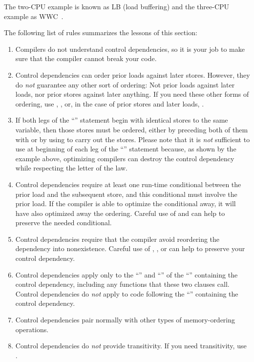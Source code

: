 The two-CPU example is known as LB (load buffering) and the three-CPU
example as WWC~\cite{Maranget2012TutorialARMPower}.

The following list of rules summarizes the lessons of this section:

\begin{enumerate}
\item	Compilers do not understand control dependencies, so it is
	your job to make sure that the compiler cannot break your code.

\item	Control dependencies can order prior loads against later stores.
	However, they do \emph{not} guarantee any other sort of ordering:
	Not prior loads against later loads, nor prior stores against
	later anything.
	If you need these other forms of ordering, use ,
	, or, in the case of prior stores and later loads,
	.

\item	If both legs of the ``'' statement begin with identical stores
	to the same variable, then those stores must be ordered,
	either by preceding both of them with  or by using
	 to carry out the stores.
	Please note that it is \emph{not} sufficient to use 
	at beginning of each leg of the ``'' statement because, as shown
	by the example above, optimizing compilers can destroy the control
	dependency while respecting the letter of the  law.

\item	Control dependencies require at least one run-time conditional
	between the prior load and the subsequent store, and this
	conditional must involve the prior load.
	If the compiler is able to optimize the conditional away, it
	will have also optimized away the ordering.
	Careful use of  and  can help
	to preserve the needed conditional.

\item	Control dependencies require that the compiler avoid reordering
	the dependency into nonexistence.
	Careful use of , , or
	 can help to preserve your control
	dependency.

\item	Control dependencies apply only to the ``'' and
	``'' of the ``'' containing the control
	dependency, including any functions that these two clauses call.
	Control dependencies do \emph{not} apply to code following the
	``'' containing the control dependency.

\item	Control dependencies pair normally with other types of
	memory-ordering operations.

\item	Control dependencies do \emph{not} provide transitivity.
	If you need transitivity, use .
\end{enumerate}

